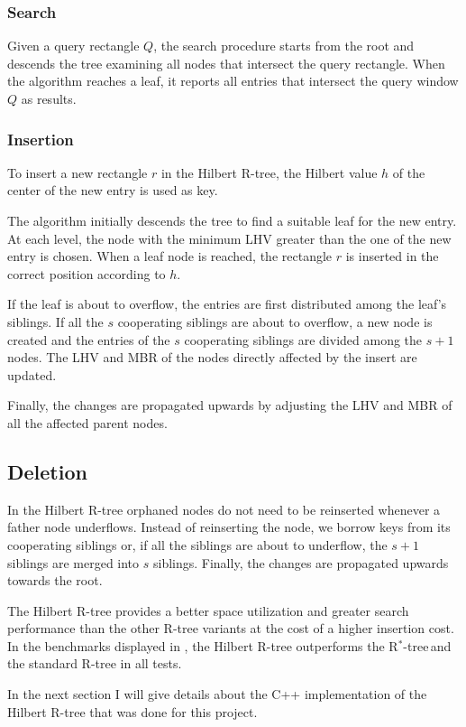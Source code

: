 \documentclass[11pt, a4paper, oneside]{article}
\newcommand{\rstar}{R$^*$-tree$\,$}
\begin{document}
\subsubsection*{Search}
Given a query rectangle $Q$, the search procedure starts from the root and descends the tree examining all nodes that intersect the query rectangle. When the algorithm reaches a leaf, it reports all entries that intersect the query window $Q$ as results.

\subsubsection*{Insertion}
To insert a new rectangle $r$ in the Hilbert R-tree, the Hilbert value $h$ of the center of the new entry is used as key. 

The algorithm initially descends the tree to find a suitable leaf for the new entry. At each level, the node with the minimum LHV greater than the one of the new entry is chosen. When a leaf node is reached, the rectangle $r$ is inserted in the correct position according to $h$.

If the leaf is about to overflow, the entries are first distributed among the leaf's siblings. If all the $s$ cooperating siblings are about to overflow, a new node is created and the entries of the $s$ cooperating siblings are divided among the $s+1$ nodes. The LHV and MBR of the nodes directly affected by the insert are updated.

Finally, the changes are propagated upwards by adjusting the LHV and MBR of all the affected parent nodes.

\subsection*{Deletion}
In the Hilbert R-tree orphaned nodes do not need to be reinserted whenever a father node underflows. Instead of reinserting the node, we borrow keys from its cooperating siblings or, if all the siblings are about to underflow, the $s+1$ siblings are merged into $s$ siblings. Finally, the changes are propagated upwards towards the root.

The Hilbert R-tree provides a better space utilization and greater search performance than the other R-tree variants at the cost of a higher insertion cost. In the benchmarks displayed in \cite{Kamel:1994:HRI:645920.673001}, the Hilbert R-tree outperforms the \rstar and the standard R-tree in all tests.

In the next section I will give details about the C++ implementation of the Hilbert R-tree that was done for this project.
\end{document}
